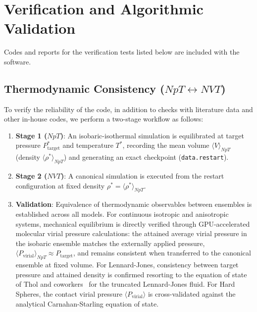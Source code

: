 \documentclass[final,5p,times,twocolumn]{elsarticle}
\begin{document}
\section{Verification and Algorithmic Validation}
\label{sec:verification}

Codes and reports for the verification tests listed below are included
with the software.

\subsection{Thermodynamic Consistency (\texorpdfstring{$NpT \leftrightarrow NVT$}{NpT <-> NVT})}
\label{sec:verif_consistency}

To verify the reliability of the code, in addition to checks with
literature data and other in-house codes, we perform a two-stage
workflow as follows:
\begin{enumerate}
    \item \textbf{Stage 1 ($NpT$)}: An isobaric-isothermal simulation
      is equilibrated at target pressure $P^*_{\text{target}}$ and
      temperature $T^*$, recording the mean volume $\langle V
      \rangle_{NpT}$ (density $\langle \rho^* \rangle_{NpT}$) and
      generating an exact checkpoint (\texttt{data.restart}). 
    \item \textbf{Stage 2 ($NVT$)}: A canonical simulation is executed
      from the restart configuration at fixed density $\rho^* =
      \langle \rho^* \rangle_{NpT}$. 
    \item \textbf{Validation}: Equivalence of thermodynamic observables
      between ensembles is established across all models. For continuous
      isotropic and anisotropic systems, mechanical equilibrium is directly
      verified through GPU-accelerated molecular virial pressure calculations:
      the attained average virial pressure in the isobaric ensemble matches
      the externally applied pressure, $\langle P_{\text{virial}} \rangle_{NpT} \approx P_{\text{target}}$,
      and remains consistent when transferred to the canonical ensemble at fixed
      volume. For Lennard-Jones, consistency between target pressure and attained
      density is confirmed resorting to the equation of state of Thol and
      coworkers~\cite{Thol2014} for the truncated Lennard-Jones fluid. For
      Hard Spheres, the contact virial pressure $\langle P_{\text{virial}} \rangle$
      is cross-validated against the analytical Carnahan-Starling equation of state.
\end{enumerate}
\end{document}
